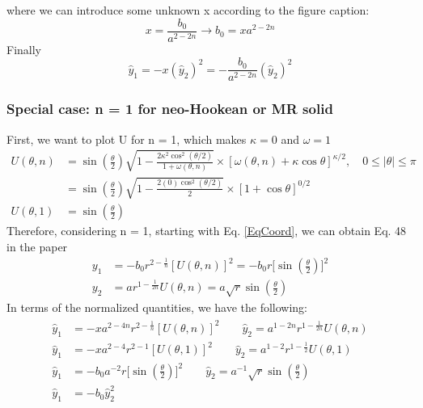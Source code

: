 \documentclass[12pt,3p]{article}
\numberwithin{equation}{section}
\begin{document}
where we can introduce some unknown x according to the figure caption: 
\begin{equation}
x = \frac{b_0}{a^{2-2n}} \rightarrow b_0 = x a^{2-2n}
\end{equation}
Finally
\begin{equation}
\hat{y}_1 = - x (\hat{y}_2)^2 = - \frac{b_0}{a^{2-2n}} (\hat{y}_2)^2 
\end{equation}

\subsubsection{Special case: n = 1 for neo-Hookean or MR solid}
First, we want to plot U for n = 1, which makes $\kappa = 0$ and $\omega = 1$
\begin{align*}
U (\theta, n) &= \sin (\frac{\theta}{2}) \sqrt{1-\frac{2 \kappa^{2} \cos ^{2}(\theta / 2)}{1+\omega(\theta, n)}} \times[\omega(\theta, n) + \kappa \cos \theta]^{\kappa / 2}, \quad 0 \leq|\theta| \leq \pi \\
		&= \sin (\frac{\theta}{2}) \sqrt{1-\frac{2 (0) \cos ^{2}(\theta / 2)}{2}} \times[ 1 + \cos \theta]^{0/2} \\ 
U (\theta, 1) &= \sin (\frac{\theta}{2}) 
\end{align*}
Therefore, considering n = 1, starting with Eq. \ref{EqCoord}, we can obtain Eq. 48 in the paper
\begin{align*}
y_1 &= -b_{0} r^{2-\frac{1}{n}} [U(\theta, n)]^{2} = -b_{0} r \bigg[\sin (\frac{\theta}{2}) \bigg]^2 \\ 
y_2 &= a r^{1 - \frac{1}{2n}} U (\theta, n) = a \sqrt{r} \sin (\frac{\theta}{2}) 
\end{align*}
In terms of the normalized quantities, we have the following: 
\begin{align}
\begin{split}
\hat{y}_1 &= - x a^{2-4n} r^{2-\frac{1}{n}}[U(\theta, n)]^{2} \quad \quad \hat{y}_2 = a^{1-2n} r^{1 - \frac{1}{2n}} U (\theta, n) \\
\hat{y}_1 &= - x a^{2-4} r^{2-1}[U(\theta, 1)]^{2} \quad \quad \hat{y}_2 = a^{1-2} r^{1 - \frac{1}{2}} U (\theta, 1) \\
\hat{y}_1 &= - b_0 a^{-2} r \bigg[\sin (\frac{\theta}{2}) \bigg]^{2} \quad \quad \hat{y}_2 = a^{-1} \sqrt{r} \sin (\frac{\theta}{2}) \\
\hat{y}_1 &= - b_0 \hat{y}_2^2
\end{split}
\end{align}
\end{document}
